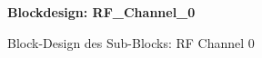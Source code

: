 \begin{landscape}
	\begin{figure}[h]
	  	\centering
		\textbf{Blockdesign: RF\_Channel\_0}
  		\caption{Block-Design des Sub-Blocks: RF Channel 0}
	\end{figure}
	

\end{landscape}
